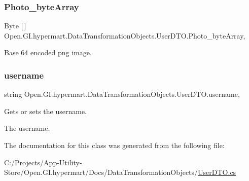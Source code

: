 \subsubsection{\texorpdfstring{Photo\+\_\+byte\+Array}{Photo\_byteArray}}
{\footnotesize\ttfamily Byte \mbox{[}$\,$\mbox{]} Open.\+G\+I.\+hypermart.\+Data\+Transformation\+Objects.\+User\+D\+T\+O.\+Photo\+\_\+byte\+Array\hspace{0.3cm}{\ttfamily [get]}, {\ttfamily [set]}}



Base 64 encoded png image. 

\hypertarget{class_open_1_1_g_i_1_1hypermart_1_1_data_transformation_objects_1_1_user_d_t_o_a123512619de906f987a3da0b7ec32bb1}{}\label{class_open_1_1_g_i_1_1hypermart_1_1_data_transformation_objects_1_1_user_d_t_o_a123512619de906f987a3da0b7ec32bb1} 
\subsubsection{\texorpdfstring{username}{username}}
{\footnotesize\ttfamily string Open.\+G\+I.\+hypermart.\+Data\+Transformation\+Objects.\+User\+D\+T\+O.\+username\hspace{0.3cm}{\ttfamily [get]}, {\ttfamily [set]}}



Gets or sets the username. 

The username. 

The documentation for this class was generated from the following file\+:\begin{DoxyCompactItemize}
\item 
C\+:/\+Projects/\+App-\/\+Utility-\/\+Store/\+Open.\+G\+I.\+hypermart/\+Docs/\+Data\+Transformation\+Objects/\hyperlink{_user_d_t_o_8cs}{User\+D\+T\+O.\+cs}\end{DoxyCompactItemize}
